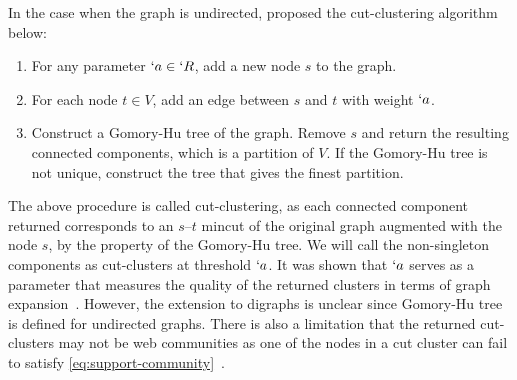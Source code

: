 In the case when the graph is undirected, \cite{flake:cut-clustering} proposed the cut-clustering algorithm below: 
\begin{enumerate}
\item For any parameter $`a\in `R$, add a new node $s$ to the graph.
\item For each node $t\in V$, add an edge between $s$ and $t$ with weight $`a$.
\item Construct a Gomory-Hu tree of the graph. Remove $s$ and return the resulting connected components, which is a partition of $V$. If the Gomory-Hu tree is not unique, construct the tree that gives the finest partition.
\end{enumerate}
The above procedure is called cut-clustering, as each connected component returned corresponds to an $s$--$t$ mincut of the original graph augmented with the node $s$, by the property of the Gomory-Hu tree. We will call the non-singleton components as cut-clusters at threshold $`a$. It was shown that $`a$ serves as a parameter that measures the quality of the returned clusters in terms of graph expansion~\cite[(3.3)]{flake:cut-clustering}. However, the extension to digraphs is unclear since Gomory-Hu tree is defined for undirected graphs. There is also a limitation that the returned cut-clusters may not be web communities as one of the nodes in a cut cluster can fail to satisfy \eqref{eq:support-community}~\cite[Lemma~3.1]{flake:cut-clustering}.